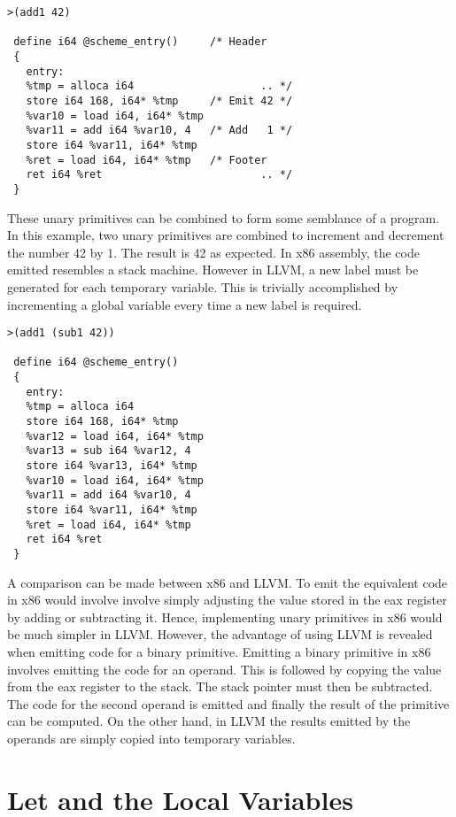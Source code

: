 \documentclass{article}
\begin{document}
\begin{verbatim}
>(add1 42)

 define i64 @scheme_entry()     /* Header
 {
   entry:
   %tmp = alloca i64                    .. */
   store i64 168, i64* %tmp     /* Emit 42 */ 
   %var10 = load i64, i64* %tmp 
   %var11 = add i64 %var10, 4   /* Add   1 */
   store i64 %var11, i64* %tmp  
   %ret = load i64, i64* %tmp   /* Footer 
   ret i64 %ret                         .. */
 }
\end{verbatim}

These unary primitives can be combined to form some semblance of a program. In this example, two unary primitives are combined to increment and decrement the number 42 by 1. The result is 42 as expected. In x86 assembly, the code emitted resembles a stack machine. However in LLVM, a new label must be generated for each temporary variable. This is trivially accomplished by incrementing a global variable every time a new label is required.


\begin{verbatim}
>(add1 (sub1 42))

 define i64 @scheme_entry()
 {
   entry: 
   %tmp = alloca i64
   store i64 168, i64* %tmp
   %var12 = load i64, i64* %tmp
   %var13 = sub i64 %var12, 4
   store i64 %var13, i64* %tmp
   %var10 = load i64, i64* %tmp
   %var11 = add i64 %var10, 4
   store i64 %var11, i64* %tmp
   %ret = load i64, i64* %tmp
   ret i64 %ret
 }
\end{verbatim}


A comparison can be made between x86 and LLVM. To emit the equivalent code in x86 would involve involve simply adjusting the value stored in the eax register by adding or subtracting it. Hence, implementing unary primitives in x86 would be much simpler in LLVM. However, the advantage of using LLVM is revealed when emitting code for a binary primitive. Emitting a binary primitive in x86 involves emitting the code for an operand. This is followed by copying the value from the eax register to the stack. The stack pointer must then be subtracted. The code for the second operand is emitted and finally the result of the primitive can be computed. On the other hand, in LLVM the results emitted by the operands are simply copied into temporary variables.


\section{Let and the Local Variables}
\end{document}
